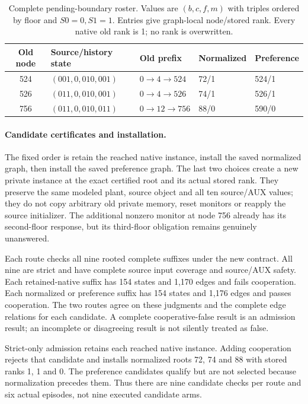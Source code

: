 \begin{table}[htbp]
\centering\small
\setlength{\abovecaptionskip}{4pt}
\setlength{\belowcaptionskip}{6pt}
\caption{Complete pending-boundary roster. Values are $(b,c,f,m)$ with
triples ordered by floor and $S0=0,S1=1$. Entries give graph-local
node/stored rank. Every native old rank is 1; no rank is overwritten.}
\label{tab:pending-native-roster}
\begin{tabular}{@{}cllll@{}}
\toprule
Old node & Source/history state & Old prefix & Normalized & Preference\\
\midrule
524 & $(001,0,010,001)$ & $0\to4\to524$ & 72/1 & 524/1\\
526 & $(011,0,010,001)$ & $0\to4\to526$ & 74/1 & 526/1\\
756 & $(011,0,010,011)$ & $0\to12\to756$ & 88/0 & 590/0\\
\bottomrule
\end{tabular}
\end{table}

\paragraph{Candidate certificates and installation.}
The fixed order is retain the reached native instance, install the saved
normalized graph, then install the saved preference graph. The last two
choices create a new private instance at the exact certified root and
its actual stored rank. They preserve the same modeled plant, source
object and all ten source/AUX values; they do not copy arbitrary old
private memory, reset monitors or reapply the source initializer.
The additional nonzero monitor at node 756 already has its second-floor
response, but its third-floor obligation remains genuinely unanswered.

Each route checks all nine rooted complete suffixes under the new
contract. All nine are strict and have complete source input coverage
and source/AUX safety. Each retained-native suffix has 154 states and
1,170 edges and fails cooperation. Each normalized or preference suffix
has 154 states and 1,176 edges and passes cooperation. The two routes
agree on these judgments and the complete edge relations for each
candidate. A complete cooperative-false result is an admission result;
an incomplete or disagreeing result is not silently treated as false.

Strict-only admission retains each reached native instance. Adding
cooperation rejects that candidate and installs normalized roots 72, 74
and 88 with stored ranks 1, 1 and 0. The preference candidates qualify
but are not selected because normalization precedes them. Thus there
are nine candidate checks per route and six actual episodes, not nine
executed candidate arms.

